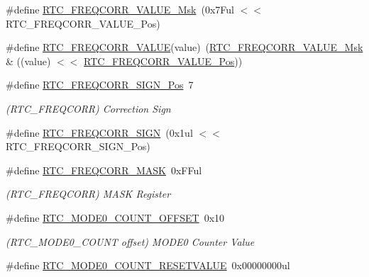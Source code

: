 \begin{DoxyCompactItemize}
\#define \mbox{\hyperlink{group___s_a_m_d21___r_t_c_ga9cab92e1c28f509c9112ba612db8bdb1}{R\+T\+C\+\_\+\+F\+R\+E\+Q\+C\+O\+R\+R\+\_\+\+V\+A\+L\+U\+E\+\_\+\+Msk}}~(0x7\+Ful $<$$<$ R\+T\+C\+\_\+\+F\+R\+E\+Q\+C\+O\+R\+R\+\_\+\+V\+A\+L\+U\+E\+\_\+\+Pos)
\item 
\#define \mbox{\hyperlink{group___s_a_m_d21___r_t_c_ga810ea0bbbbe7c9e2be4190654aaed4d1}{R\+T\+C\+\_\+\+F\+R\+E\+Q\+C\+O\+R\+R\+\_\+\+V\+A\+L\+UE}}(value)~(\mbox{\hyperlink{group___s_a_m_d21___r_t_c_ga9cab92e1c28f509c9112ba612db8bdb1}{R\+T\+C\+\_\+\+F\+R\+E\+Q\+C\+O\+R\+R\+\_\+\+V\+A\+L\+U\+E\+\_\+\+Msk}} \& ((value) $<$$<$ \mbox{\hyperlink{group___s_a_m_d21___r_t_c_ga1a30c52fa03ef3638300859f277401f0}{R\+T\+C\+\_\+\+F\+R\+E\+Q\+C\+O\+R\+R\+\_\+\+V\+A\+L\+U\+E\+\_\+\+Pos}}))
\item 
\#define \mbox{\hyperlink{group___s_a_m_d21___r_t_c_ga1ff71647496cb2872a1b7cc108eadff6}{R\+T\+C\+\_\+\+F\+R\+E\+Q\+C\+O\+R\+R\+\_\+\+S\+I\+G\+N\+\_\+\+Pos}}~7
\begin{DoxyCompactList}\small\item\em (R\+T\+C\+\_\+\+F\+R\+E\+Q\+C\+O\+RR) Correction Sign \end{DoxyCompactList}\item 
\#define \mbox{\hyperlink{group___s_a_m_d21___r_t_c_ga3e8e0257dc6a63f34bfa19b3db3b2595}{R\+T\+C\+\_\+\+F\+R\+E\+Q\+C\+O\+R\+R\+\_\+\+S\+I\+GN}}~(0x1ul $<$$<$ R\+T\+C\+\_\+\+F\+R\+E\+Q\+C\+O\+R\+R\+\_\+\+S\+I\+G\+N\+\_\+\+Pos)
\item 
\#define \mbox{\hyperlink{group___s_a_m_d21___r_t_c_ga40cc845a8d0d60c11881f84adeff7947}{R\+T\+C\+\_\+\+F\+R\+E\+Q\+C\+O\+R\+R\+\_\+\+M\+A\+SK}}~0x\+F\+Ful
\begin{DoxyCompactList}\small\item\em (R\+T\+C\+\_\+\+F\+R\+E\+Q\+C\+O\+RR) M\+A\+SK Register \end{DoxyCompactList}\item 
\#define \mbox{\hyperlink{group___s_a_m_d21___r_t_c_gad9373b782c3160b8074bf71abfd9eb7e}{R\+T\+C\+\_\+\+M\+O\+D\+E0\+\_\+\+C\+O\+U\+N\+T\+\_\+\+O\+F\+F\+S\+ET}}~0x10
\begin{DoxyCompactList}\small\item\em (R\+T\+C\+\_\+\+M\+O\+D\+E0\+\_\+\+C\+O\+U\+NT offset) M\+O\+D\+E0 Counter Value \end{DoxyCompactList}\item 
\#define \mbox{\hyperlink{group___s_a_m_d21___r_t_c_ga195a04c68c30c2bfa06a58e9d7909e7f}{R\+T\+C\+\_\+\+M\+O\+D\+E0\+\_\+\+C\+O\+U\+N\+T\+\_\+\+R\+E\+S\+E\+T\+V\+A\+L\+UE}}~0x00000000ul
$$
\end{DoxyCompactItemize}
